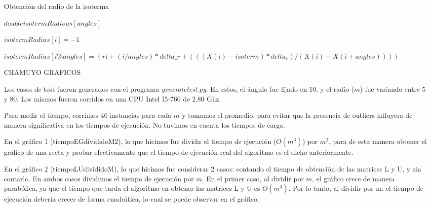 \documentclass[a4paper]{article}
\begin{document}
\begin{algorithm}
\caption{Obtención del radio de la isoterma}\label{euclid}
\begin{algorithmic}[1]



    \State $double isotermRadious[angles]$

      \State $isotermRadius[i] = -1$
    \EndFor

       \State $isotermRadius[i \% angles] = (ri + (i / angles)*delta\_r + (((X(i) - isoterm) * delta_r)/ (X(i) - X(i+angles)) ))$
      \EndIf
    \EndFor

  \EndFunction

\end{algorithmic}
\end{algorithm}

\newpage


CHAMUYO GRAFICOS


Los casos de test fueron generados con el programa \textit{generatetest.py}. En estos, el ángulo fue fijado en $10$, y el radio ($m$) fue variando entre $5$ y $80$. Los mismos fueron corridos en una CPU Intel I5-760 de 2.80 Ghz.

Para medir el tiempo, corrimos $40$ instancias para cada $m$ y tomamos el promedio, para evitar que la presencia de outliers influyera de manera significativa en los tiempos de ejecución. No tuvimos en cuenta los tiempos de carga.

En el gráfico 1 (tiempoEGdivididoM2), lo que hicimos fue dividir el tiempo de ejecución ($O(m^{3})$) por $m^{2}$, para de esta manera obtener el gráfico de una recta y probar efectivamente que el tiempo de ejecución real del algoritmo es el dicho anteriormente.

En el gráfico 2 (tiempoLUdivididoM), lo que hicimos fue considerar 2 casos: contando el tiempo de obtención de las matrices L y U, y sin contarlo. En ambos casos dividimos el tiempo de ejecución por $m$. En el primer caso, al dividir por $m$, el gráfico crece de manera parabólica, ya que el tiempo que tarda el algoritmo en obtener las matrices L y U es $O(m^{3})$. Por lo tanto, al dividir por m, el tiempo de ejecución debería crecer de forma cuadrática, lo cual se puede observar en el gráfico. 
\end{document}
